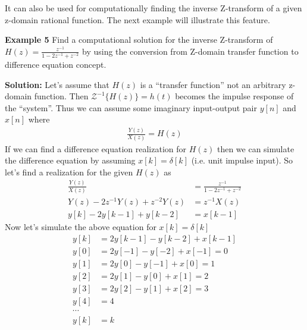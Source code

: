 \documentclass[twoside]{article}
\begin{document}
It can also be used for computationally finding the
inverse Z-transform of a given z-domain rational function. 
The next example will illustrate this feature. 

\textbf{Example 5} Find a computational solution for the inverse Z-transform of $H(z) =
\frac{z^{-1}}{1 - 2 z^{-1} + z^{-2}}$ by using the conversion from
Z-domain transfer function to difference equation concept. 

\textbf{Solution:} Let's assume that $H(z)$ is a ``transfer function''
not an arbitrary z-domain function. Then $\mathcal{Z}^{-1} \lbrace
H(z) \rbrace = h(t)$ becomes the impulse response of the ``system''. 
Thus we can assume some imaginary input-output pair $y[n]$ and
$x[n]$ where 
%
\begin{align*}
  \frac{Y(z)}{X(z)} = H(z) 
\end{align*}
%
If we can find a difference equation realization for $H(z)$
then we can simulate the difference equation by assuming
$x[k] = \delta[k]$ (i.e. unit impulse input). So let's find a
realization for the given $H(z)$ as
%
\begin{align*}
  \frac{Y(z)}{X(z)} &= \frac{z^{-1}}{1 - 2 z^{-1} + z^{-2}}
\\
Y(z) - 2 z^{-1} Y(z) + z^{-2} Y(z) &= z^{-1} X(z)
\\
y[k] - 2 y[k-1] + y[k-2] &= x[k-1]
\end{align*}
%
Now let's simulate the above equation for $x[k] = \delta[k]$
%
\begin{align*}
y[k] &= 2 y[k-1] - y[k-2]  + x[k-1]
\\
y[0] &= 2 y[-1] - y[-2]  + x[-1] = 0
\\
y[1] &= 2 y[0] - y[-1]  + x[0] = 1
\\
y[2] &= 2 y[1] - y[0]  + x[1] = 2
\\
y[3] &= 2 y[2] - y[1]  + x[2] = 3
\\
y[4] &= 4
\\
\cdots 
\\
y[k] &= k
\end{align*}
%




\end{document}
